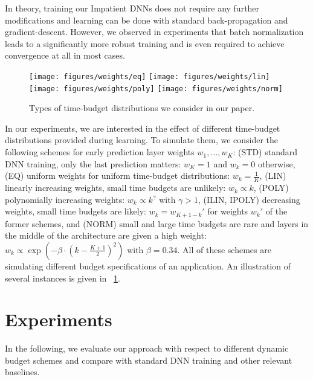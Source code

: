 \documentclass{bmvc2k}
\begin{document}
    In theory, training our Impatient DNNs does not require any further modifications
    and learning can be done with standard back-propagation and gradient-descent.
    However, we observed in experiments that batch normalization~\cite{ioffe2015batch} leads
    to a significantly more robust training and is even required to achieve convergence
    at all in most cases.

    \begin{figure}[tb]
        \texttt{[image: figures/weights/eq]}
        \texttt{[image: figures/weights/lin]}
        \texttt{[image: figures/weights/poly]}
        \texttt{[image: figures/weights/norm]}
        \caption{Types of time-budget distributions we consider in our paper.}
        \label{fig:budgettypes}
    \end{figure}
    In our experiments, we are interested in the effect of different time-budget distributions provided during learning.
    To simulate them, we consider the following schemes for early prediction layer weights $w_1, \ldots, w_K$:
    (STD) standard DNN training, \ie only the last prediction matters: $w_K = 1$ and $w_k = 0$ otherwise,
    (EQ) uniform weights for uniform time-budget distributions: $w_k = \frac{1}{K}$,
    (LIN) linearly increasing weights, \ie small time budgets are unlikely: $w_k \propto k$,
    (POLY) polynomially increasing weights: $w_k \propto k^\gamma$ with $\gamma > 1$,
    (ILIN, IPOLY) decreasing weights, \ie small time budgets are likely: $w_k = w_{K+1-k}'$ for weights $w_k'$ of the former schemes,
    and (NORM) small and large time budgets are rare and layers in the middle of the architecture are given a high weight: $w_k \propto \exp(- \beta \cdot (k-\frac{K+1}{2})^2)$ with $\beta = 0.34$.
    All of these schemes are simulating different budget specifications of an application.
    An illustration of several instances is given in \figurename~\ref{fig:budgettypes}.

\section{Experiments}
\label{sec:exp}

    In the following, we evaluate our approach with respect to different dynamic budget schemes and compare with
    standard DNN training and other relevant baselines.

\end{document}
